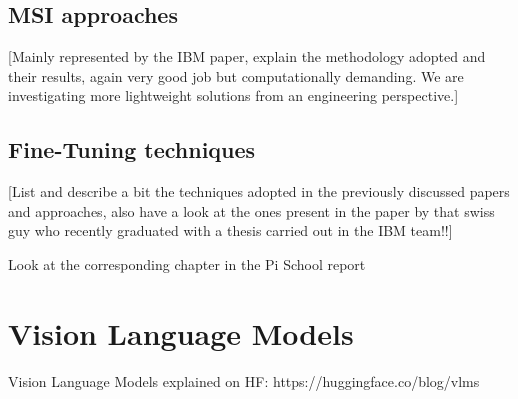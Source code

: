 \documentclass[a4paper, oneside, english]{sapthesis}
\begin{document}
\section{MSI approaches}

[Mainly represented by the IBM paper, explain the methodology adopted and their results, again very good job but computationally demanding. We are investigating more lightweight solutions from an engineering perspective.]


\section{Fine-Tuning techniques}

[List and describe a bit the techniques adopted in the previously discussed papers and approaches, also have a look at the ones present in the paper by that swiss guy who recently graduated with a thesis carried out in the IBM team!!]

Look at the corresponding chapter in the Pi School report


\chapter{Vision Language Models}  %

Vision Language Models explained on HF: https://huggingface.co/blog/vlms


\end{document}
